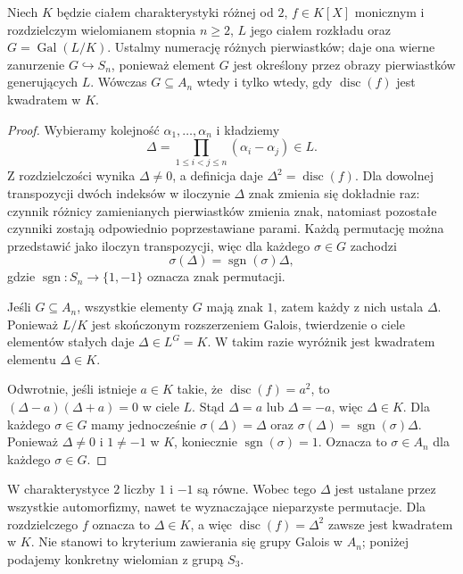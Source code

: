 \begin{twierdzenie}\label{aa:tw:disc-alternating}
Niech $K$ będzie ciałem charakterystyki różnej od $2$,
$f\in K[X]$ monicznym i rozdzielczym wielomianem
stopnia $n\ge2$, $L$ jego ciałem rozkładu oraz
$G=\operatorname{Gal}(L/K)$.
Ustalmy numerację różnych pierwiastków; daje ona wierne
zanurzenie $G\hookrightarrow S_n$, ponieważ element $G$
jest określony przez obrazy pierwiastków generujących $L$.
Wówczas $G\subseteq A_n$ wtedy i tylko wtedy,
gdy $\operatorname{disc}(f)$ jest kwadratem w $K$.
\end{twierdzenie}
\begin{proof}
Wybieramy kolejność $\alpha_1,\ldots,\alpha_n$ i kładziemy
\[
 \Delta=\prod_{1\le i<j\le n}(\alpha_i-\alpha_j)\in L.
\]
Z rozdzielczości wynika $\Delta\ne0$, a definicja
daje $\Delta^2=\operatorname{disc}(f)$.
Dla dowolnej transpozycji dwóch indeksów
w iloczynie $\Delta$ znak zmienia się dokładnie
raz: czynnik różnicy zamienianych pierwiastków
zmienia znak, natomiast pozostałe czynniki
zostają odpowiednio poprzestawiane parami.
Każdą permutację można przedstawić jako iloczyn
transpozycji, więc dla każdego $\sigma\in G$ zachodzi
\[
 \sigma(\Delta)=\operatorname{sgn}(\sigma)\Delta,
\]
gdzie $\operatorname{sgn}:S_n\to\{1,-1\}$
oznacza znak permutacji.

Jeśli $G\subseteq A_n$, wszystkie elementy $G$
mają znak $1$, zatem każdy z nich ustala $\Delta$.
Ponieważ $L/K$ jest skończonym rozszerzeniem Galois,
twierdzenie o ciele elementów stałych daje
$\Delta\in L^G=K$. W takim razie wyróżnik jest
kwadratem elementu $\Delta\in K$.

Odwrotnie, jeśli istnieje $a\in K$ takie, że
$\operatorname{disc}(f)=a^2$, to
$(\Delta-a)(\Delta+a)=0$ w ciele $L$.
Stąd $\Delta=a$ lub $\Delta=-a$, więc $\Delta\in K$.
Dla każdego $\sigma\in G$ mamy jednocześnie
$\sigma(\Delta)=\Delta$ oraz
$\sigma(\Delta)=\operatorname{sgn}(\sigma)\Delta$.
Ponieważ $\Delta\ne0$ i $1\ne-1$ w $K$, koniecznie
$\operatorname{sgn}(\sigma)=1$. Oznacza to
$\sigma\in A_n$ dla każdego $\sigma\in G$.
\end{proof}

\begin{uwaga}
W charakterystyce $2$ liczby $1$ i $-1$ są równe.
Wobec tego $\Delta$ jest ustalane przez wszystkie
automorfizmy, nawet te wyznaczające nieparzyste
permutacje. Dla rozdzielczego $f$ oznacza to
$\Delta\in K$, a więc $\operatorname{disc}(f)=\Delta^2$
zawsze jest kwadratem w $K$. Nie stanowi to kryterium
zawierania się grupy Galois w $A_n$; poniżej podajemy
konkretny wielomian z grupą $S_3$.
\end{uwaga}

